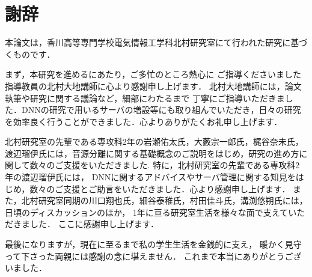 \chapter{謝辞}

本論文は，香川高等専門学校電気情報工学科北村研究室にて行われた研究に基づくものです．

まず，本研究を進めるにあたり，ご多忙のところ熱心に
ご指導くださいました指導教員の北村大地講師に心より感謝申し上げます．
北村大地講師には，論文執筆や研究に関する議論など，細部にわたるまで
丁寧にご指導いただきました．DNNの研究で用いるサーバの増設等にも取り組んでいただき，日々の研究を効率良く行うことができました．心よりありがたくお礼申し上げます．

北村研究室の先輩である専攻科2年の岩瀬佑太氏，大藪宗一郎氏，梶谷奈未氏，渡辺瑠伊氏には，音源分離に関する基礎概念のご説明をはじめ，研究の進め方に関して数々のご支援をいただきました.
特に，北村研究室の先輩である専攻科2年の渡辺瑠伊氏には，
DNNに関するアドバイスやサーバ管理に関する知見をはじめ，数々のご支援とご助言をいただきました．心より感謝申し上げます．
また，北村研究室同期の川口翔也氏，細谷泰稚氏，村田佳斗氏，溝渕悠朔氏には，日頃のディスカッションのほか，
1年に亘る研究室生活を様々な面で支えていただきました．
ここに感謝申し上げます．

最後になりますが，現在に至るまで私の学生生活を金銭的に支え，
暖かく見守って下さった両親には感謝の念に堪えません．
これまで本当にありがとうございました．
